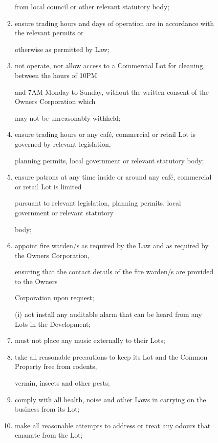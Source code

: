 \documentclass{article}
\begin{document}
\begin{enumerate}[label=\arabic*.]
\begin{enumerate}[label=\arabic{enumi}.\arabic*.]
\begin{enumerate}[label=(\arabic*)]
\begin{enumerate}[label=(\alph*)]
from local council or other relevant statutory body; 

\item  ensure trading hours and days of operation are in accordance with the relevant permits or 

otherwise as permitted by Law; 

\item  not operate, nor allow access to a Commercial Lot for cleaning, between the hours of 10PM 

and 7AM Monday to Sunday, without the written consent of the Owners Corporation which 

\newpage

may not be unreasonably withheld; 

\item  ensure trading hours or any café, commercial or retail Lot is governed by relevant legislation, 

planning permits, local government or relevant statutory body; 

\item  ensure patrons at any time inside or around any café, commercial or retail Lot is limited 

pursuant to relevant legislation, planning permits, local government or relevant statutory 

body; 

\item  appoint fire warden/s as required by the Law and as required by the Owners Corporation, 

ensuring that the contact details of the fire warden/s are provided to the Owners 

Corporation upon request; 

(i) not install any auditable alarm that can be heard from any Lots in the Development; 

\item  must not place any music externally to their Lots; 

\item  take all reasonable precautions to keep its Lot and the Common Property free from rodents, 

vermin, insects and other pests; 

\item  comply with all health, noise and other Laws in carrying on the business from its Lot; 

\item  make all reasonable attempts to address or treat any odours that emanate from the Lot; 


\end{enumerate}
\end{enumerate}
\end{enumerate}
\end{enumerate}
\end{document}
